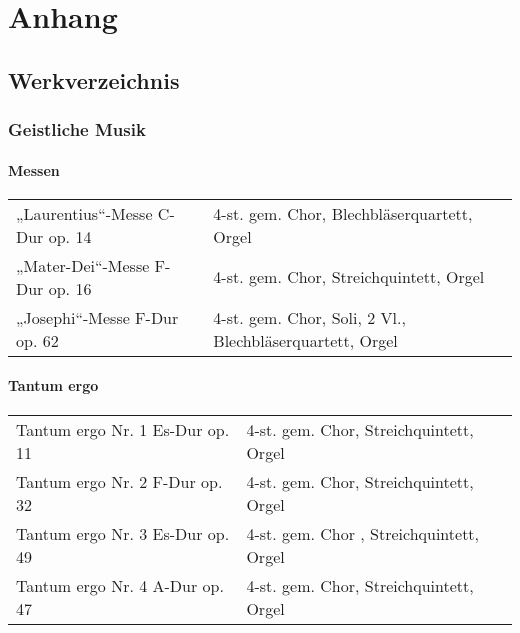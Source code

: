 \documentclass{book}
\begin{document}
















\chapter{Anhang}
\section{Werkverzeichnis}

\subsection{Geistliche Musik}

\newcommand{\klein}[1]{\tiny#1}

\newenvironment{tabelle}{\begin{tabular}{p{8cm}l}}{\end{tabular}}

\subsubsection{Messen}

\begin{tabelle}
„Laurentius“-Messe C-Dur op. 14 &
\klein{4-st. gem. Chor, Blechbläserquartett, Orgel}\\

„Mater-Dei“-Messe F-Dur op. 16 &
\klein{4-st. gem. Chor, Streichquintett, Orgel}\\

„Josephi“-Messe F-Dur op. 62 &
\klein{4-st. gem. Chor, Soli, 2 Vl., Blechbläserquartett, Orgel}\\
\end{tabelle}

\subsubsection{Tantum ergo}

\begin{tabelle}
Tantum ergo Nr. 1 Es-Dur op. 11 &
\klein{4-st. gem. Chor, Streichquintett, Orgel}\\

Tantum ergo Nr. 2 F-Dur op. 32 &
\klein{4-st. gem. Chor, Streichquintett, Orgel}\\

Tantum ergo Nr. 3 Es-Dur op. 49 &
\klein{4-st. gem. Chor , Streichquintett, Orgel}\\

Tantum ergo Nr. 4 A-Dur op. 47 &
\klein{4-st. gem. Chor, Streichquintett, Orgel}\\
\end{tabelle}
\end{document}
